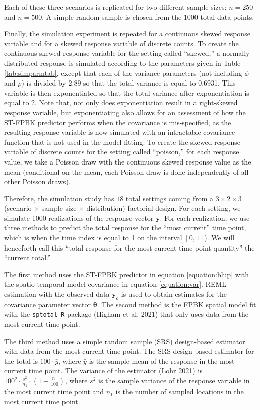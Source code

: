 \documentclass[smallextended]{svjour3}       %
\begin{document}
Each of these three scenarios is replicated for two different sample
sizes: \(n = 250\) and \(n = 500\). A simple random sample is chosen
from the 1000 total data points.

Finally, the simulation experiment is repeated for a continuous skewed
response variable and for a skewed response variable of discrete counts.
To create the continuous skewed response variable for the setting called
``skewed,'' a normally-distributed response is simulated according to
the parameters given in Table \ref{tab:simparmtab}, except that each of
the variance parameters (not including \(\phi\) and \(\rho\)) is divided
by 2.89 so that the total variance is equal to 0.6931. This variable is
then exponentiated so that the total variance after exponentiation is
equal to 2. Note that, not only does exponentiation result in a
right-skewed response variable, but exponentiating also allows for an
assessment of how the ST-FPBK predictor performs when the covariance is
mis-specified, as the resulting response variable is now simulated with
an intractable covariance function that is not used in the model
fitting. To create the skewed response variable of discrete counts for
the setting called ``poisson,'' for each response value, we take a
Poisson draw with the continuous skewed response value as the mean
(conditional on the mean, each Poisson draw is done independently of all
other Poisson draws).

Therefore, the simulation study has \(18\) total settings coming from a
\(3 \times 2 \times 3\) (scenario \(\times\) sample size \(\times\)
distribution) factorial design. For each setting, we simulate 1000
realizations of the response vector \(\mathbf{y}\). For each
realization, we use three methods to predict the total response for the
``most current'' time point, which is when the time index is equal to 1
on the interval \([0, 1]\)). We will henceforth call this ``total
response for the most current time point quantity'' the ``current
total.''

The first method uses the ST-FPBK predictor in equation
\ref{equation:blup} with the spatio-temporal model covariance in
equation \ref{equation:var}. REML estimation with the observed data
\(\mathbf{y}_o\) is used to obtain estimates for the covariance
parameter vector \(\bm{\theta}\). The second method is the FPBK spatial
model fit with the \texttt{sptotal R} package (Higham et al. 2021) that
only uses data from the most current time point.

The third method uses a simple random sample (SRS) design-based
estimator with data from the most current time point. The SRS
design-based estimator for the total is \(100 \cdot \bar{y}\), where
\(\bar{y}\) is the sample mean of the response in the most current time
point. The variance of the estimator (Lohr 2021) is
\(100^2 \cdot \frac{s^2}{n_1} \cdot (1 - \frac{n_1}{100})\), where
\(s^2\) is the sample variance of the response variable in the most
current time point and \(n_1\) is the number of sampled locations in the
most current time point.
\end{document}
